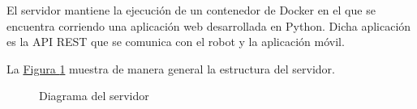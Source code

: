 El servidor mantiene la ejecución de un contenedor de
Docker en el que se encuentra corriendo una aplicación web desarrollada en Python.
Dicha aplicación es la API REST que se comunica con el robot y la aplicación móvil.

La \hyperref[\detokenize{chapter_two/desc_cloudnao:cn-server-lar-diagram}]{Figura \ref{\detokenize{chapter_two/desc_cloudnao:cn-server-lar-diagram}}} muestra de manera general la estructura del
servidor.

\begin{figure}[htbp]
\centering
\capstart

\noindent{}
\caption{Diagrama del servidor}\label{\detokenize{chapter_two/desc_cloudnao:cn-server-lar-diagram}}\end{figure}
